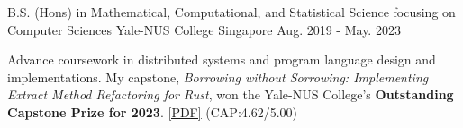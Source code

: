

\begin{cventries}

  \cventry
    {B.S. (Hons) in Mathematical, Computational, and Statistical Science focusing on Computer Sciences} %
    {Yale-NUS College} %
    {Singapore} %
    {Aug. 2019 - May. 2023} %
    {
     \begin{cvitems} %
       \item {Advance coursework in distributed systems and program language design and implementations. My capstone, \textit{Borrowing without Sorrowing: Implementing Extract Method Refactoring for Rust}, won the Yale-NUS College's \textbf{Outstanding Capstone Prize for 2023}. \href{https://fastmail-resource.sewenthy.dev/public/academics/bsc_capstone_borrowing_without_sorrowing.pdf}{[PDF]}} (CAP:4.62/5.00)
      \end{cvitems}
    }

\end{cventries}
